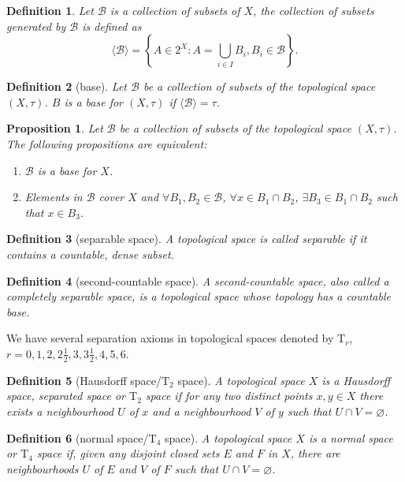 \documentclass{report}
\newtheorem{definition}{Definition}[section]
\newtheorem{proposition}{Proposition}[section]
\theoremstyle{nonumberplain}
\begin{document}
\begin{definition}
	Let $\mathcal{B}$ is a collection of subsets of $X$, the collection of subsets generated by $\mathcal{B}$ is defined as
	\[
		\langle\mathcal{B}\rangle=\left\{A\in 2^X:A=\bigcup_{i\in I} B_i,B_i\in\mathcal{B}\right\}.
	\]
\end{definition}
\begin{definition}[base]
	Let $\mathcal{B}$ be a collection of subsets of the topological space $(X,\tau)$. $B$ is a \emph{base} for $(X,\tau)$ if
	$\langle\mathcal{B}\rangle=\tau$.
\end{definition}
\begin{proposition}
	Let $\mathcal{B}$ be a collection of subsets of the topological space $(X,\tau)$. The following propositions are equivalent:
	\begin{enumerate}
		\item $\mathcal{B}$ is a base for $X$.
		\item Elements in $\mathcal{B}$ cover $X$ and $\forall B_1,B_2\in\mathcal{B}$, $\forall x\in B_1\cap B_2$, $\exists B_3\in B_1\cap B_2$ such that $x\in B_3$.
	\end{enumerate}
\end{proposition}


\begin{definition}[separable space]
	A topological space is called \emph{separable} if it contains a countable, dense subset.
\end{definition}

\begin{definition}[second-countable space]
	A \emph{second-countable} space, also called a completely separable space, is a topological space whose topology has a countable base.
\end{definition}

We have several separation axioms in topological spaces denoted by $\mathrm{T}_r$, $r=0,1,2,2\frac{1}{2},3,3\frac{1}{2},4,5,6$.
\begin{definition}[Hausdorff space/$\mathrm{T}_2$ space]
	A topological space $X$ is a \emph{Hausdorff space}, separated space or $\mathrm{T}_2$ space if for any two distinct points $x,y\in X$ there exists a neighbourhood $U$ of $x$ and a neighbourhood $V$ of $y$ such that $U\cap V=\varnothing$.
\end{definition}
\begin{definition}[normal space/$\mathrm{T}_4$ space]
	A topological space $X$ is a \emph{normal space} or $\mathrm{T}_4$ space if, given any disjoint closed sets $E$ and $F$ in $X$, there are neighbourhoods $U$ of $E$ and $V$ of $F$ such that $U\cap V=\varnothing$.
\end{definition}
\end{document}
